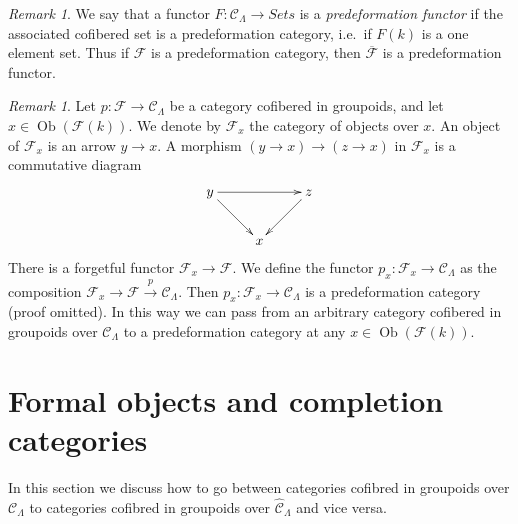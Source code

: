 \documentclass{stacks-project}
\theoremstyle{plain}
\theoremstyle{definition}
\theoremstyle{remark}
\newtheorem{remark}[subsection]{Remark}
\numberwithin{equation}{subsection}
\def\Ob{\mathop{\mathrm{Ob}}\nolimits}
\begin{document}
\begin{remark}
\label{remark-predeformation-functor}
We say that a functor $F: \mathcal{C}_\Lambda \to \textit{Sets}$
is a {\it predeformation functor} if the associated cofibered set is a
predeformation category, i.e.\ if $F(k)$ is a one element set.  Thus if
$\mathcal{F}$ is a predeformation category, then $\overline{\mathcal{F}}$ is a
predeformation functor.
\end{remark}

\begin{remark}
\label{remark-localize-cofibered-groupoid}
Let $p : \mathcal{F} \to \mathcal{C}_\Lambda$ be a category cofibered in
groupoids, and let $x \in \Ob(\mathcal{F}(k))$.  We denote by
$\mathcal{F}_x$ the category of objects over $x$.
An object of $\mathcal{F}_x$ is an arrow $y \to x$.
A morphism $(y \to x) \to (z \to x)$ in $\mathcal{F}_x$ is a commutative
diagram
$$
\xymatrix{
y \ar[rr] \ar[dr] & & z \ar[dl] \\
& x &
}
$$
There is a forgetful functor $\mathcal{F}_x \to \mathcal{F}$. We define
the functor $p_x : \mathcal{F}_x \to \mathcal{C}_\Lambda$ as the
composition
$\mathcal{F}_x \to \mathcal{F} \xrightarrow{p} \mathcal{C}_\Lambda$.
Then $p_x : \mathcal{F}_x \to \mathcal{C}_\Lambda$ is a
predeformation category (proof omitted). In this way we can pass from an
arbitrary category cofibered in groupoids over $\mathcal{C}_\Lambda$
to a predeformation category at any $x \in \Ob(\mathcal{F}(k))$.
\end{remark}






\section{Formal objects and completion categories}
\label{section-formal-objects}

\noindent
In this section we discuss how to go between categories cofibred in
groupoids over $\mathcal{C}_\Lambda$ to categories cofibred in
groupoids over $\widehat{\mathcal{C}}_\Lambda$ and vice versa.
\end{document}
